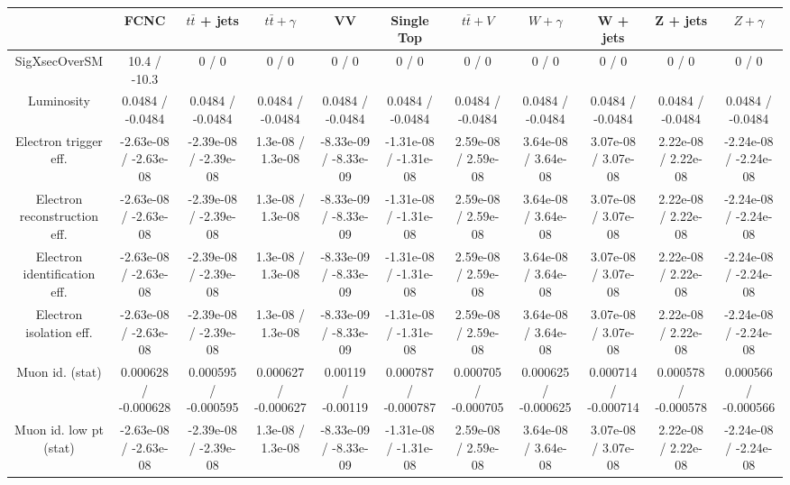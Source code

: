 \begin{table}[htbp]
\begin{center}
\footnotesize
\begin{tabular}{|c|c|c|c|c|c|c|c|c|c|c|}
\hline 
      & FCNC      & $t\bar{t}$ + jets      & $t\bar{t} +  \gamma $     & VV      & Single Top      & $t\bar{t} + V$      & $W+\gamma$     & W + jets      & Z + jets      & $Z+\gamma$ \\ 
\hline 
 SigXsecOverSM & 10.4 / -10.3 & 0 / 0 & 0 / 0 & 0 / 0 & 0 / 0 & 0 / 0 & 0 / 0 & 0 / 0 & 0 / 0 & 0 / 0 \\ 
  Luminosity & 0.0484 / -0.0484 & 0.0484 / -0.0484 & 0.0484 / -0.0484 & 0.0484 / -0.0484 & 0.0484 / -0.0484 & 0.0484 / -0.0484 & 0.0484 / -0.0484 & 0.0484 / -0.0484 & 0.0484 / -0.0484 & 0.0484 / -0.0484 \\ 
  Electron trigger eff. & -2.63e-08 / -2.63e-08 & -2.39e-08 / -2.39e-08 & 1.3e-08 / 1.3e-08 & -8.33e-09 / -8.33e-09 & -1.31e-08 / -1.31e-08 & 2.59e-08 / 2.59e-08 & 3.64e-08 / 3.64e-08 & 3.07e-08 / 3.07e-08 & 2.22e-08 / 2.22e-08 & -2.24e-08 / -2.24e-08 \\ 
  Electron reconstruction eff. & -2.63e-08 / -2.63e-08 & -2.39e-08 / -2.39e-08 & 1.3e-08 / 1.3e-08 & -8.33e-09 / -8.33e-09 & -1.31e-08 / -1.31e-08 & 2.59e-08 / 2.59e-08 & 3.64e-08 / 3.64e-08 & 3.07e-08 / 3.07e-08 & 2.22e-08 / 2.22e-08 & -2.24e-08 / -2.24e-08 \\ 
  Electron identification eff. & -2.63e-08 / -2.63e-08 & -2.39e-08 / -2.39e-08 & 1.3e-08 / 1.3e-08 & -8.33e-09 / -8.33e-09 & -1.31e-08 / -1.31e-08 & 2.59e-08 / 2.59e-08 & 3.64e-08 / 3.64e-08 & 3.07e-08 / 3.07e-08 & 2.22e-08 / 2.22e-08 & -2.24e-08 / -2.24e-08 \\ 
  Electron isolation eff. & -2.63e-08 / -2.63e-08 & -2.39e-08 / -2.39e-08 & 1.3e-08 / 1.3e-08 & -8.33e-09 / -8.33e-09 & -1.31e-08 / -1.31e-08 & 2.59e-08 / 2.59e-08 & 3.64e-08 / 3.64e-08 & 3.07e-08 / 3.07e-08 & 2.22e-08 / 2.22e-08 & -2.24e-08 / -2.24e-08 \\ 
  Muon id. (stat) & 0.000628 / -0.000628 & 0.000595 / -0.000595 & 0.000627 / -0.000627 & 0.00119 / -0.00119 & 0.000787 / -0.000787 & 0.000705 / -0.000705 & 0.000625 / -0.000625 & 0.000714 / -0.000714 & 0.000578 / -0.000578 & 0.000566 / -0.000566 \\ 
  Muon id. low pt (stat) & -2.63e-08 / -2.63e-08 & -2.39e-08 / -2.39e-08 & 1.3e-08 / 1.3e-08 & -8.33e-09 / -8.33e-09 & -1.31e-08 / -1.31e-08 & 2.59e-08 / 2.59e-08 & 3.64e-08 / 3.64e-08 & 3.07e-08 / 3.07e-08 & 2.22e-08 / 2.22e-08 & -2.24e-08 / -2.24e-08 \\ 

\end{tabular}
\end{center}
\end{table}
